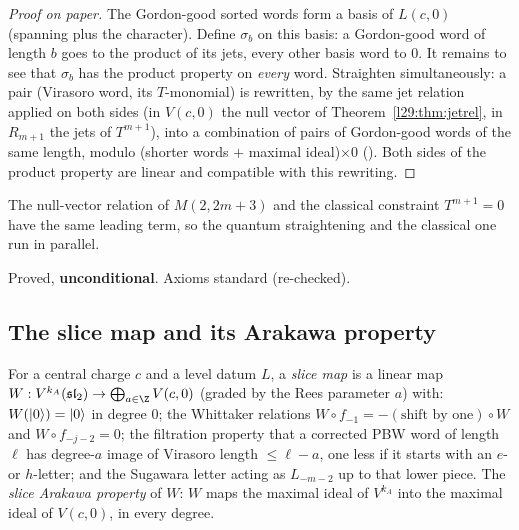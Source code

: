 \begin{proof}[Proof on paper]
The Gordon-good sorted words form a basis of $L(c,0)$ (spanning plus the character). Define $\sigma_b$ on this basis:
a Gordon-good word of length $b$ goes to the product of its jets, every other basis word to $0$. It remains to see
that $\sigma_b$ has the product property on \emph{every} word. Straighten simultaneously: a pair (Virasoro word, its
$T$-monomial) is rewritten, by the same jet relation applied on both sides (in $V(c,0)$ the null vector of
Theorem~\ref{l29:thm:jetrel}, in $R_{m+1}$ the jets of $T^{m+1}$), into a combination of pairs of Gordon-good words of
the same length, modulo (shorter words $+$ maximal ideal)$\times0$ (). Both sides of the product
property are linear and compatible with this rewriting.
\end{proof}

\begin{physics}
The null-vector relation of $M(2,2m+3)$ and the classical constraint $T^{m+1}=0$ have the same leading term, so the
quantum straightening and the classical one run in parallel.
\end{physics}

\begin{status}
Proved, \textbf{unconditional}. Axioms standard (re-checked).
\end{status}

\subsection{The slice map and its Arakawa property}

\begin{definition}\label{l29:def:dsslice}
For a central charge $c$ and a level datum $L$, a \emph{slice map} is a linear map $W:V^{k_A}(\ltwentyninesl)\to
\bigoplus_{a\in\Z}V(c,0)$ (graded by the Rees parameter $a$) with: $W(|0\rangle)=|0\rangle$ in degree $0$;
the Whittaker relations $W\circ f_{-1}=-(\text{shift by one})\circ W$ and $W\circ f_{-j-2}=0$; the filtration property
that a corrected PBW word of length $\ell$ has degree-$a$ image of Virasoro length $\le\ell-a$, one less if it starts with
an $e$- or $h$-letter; and the Sugawara letter acting as $L_{-m-2}$ up to that lower piece. The \emph{slice Arakawa
property} of $W$: $W$ maps the maximal ideal of $V^{k_A}$ into the maximal ideal of $V(c,0)$, in every degree.
\end{definition}

